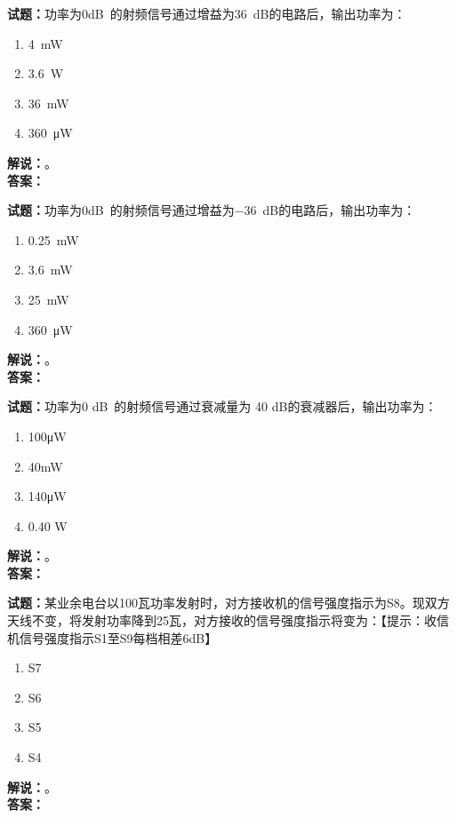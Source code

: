 \documentclass{ctexbook}
\begin{document}
\bigskip




\noindent\textbf{试题：}功率为\num{0}\unit[qualifier-mode=combine]{\deci\bel{}}的射频信号通过增益为\SI{36}{\dB}的电路后，输出功率为：
\begin{enumerate}[leftmargin=3em]
\item \SI{4}{\mW}
\item \SI{3.6}{\W}
\item \SI{36}{\mW}
\item \SI{360}{\uW}
\end{enumerate}
\noindent\textbf{解说：}\textbf{}。\\\noindent\textbf{答案：}

\bigskip




\noindent\textbf{试题：}功率为\num{0}\unit[qualifier-mode=combine]{\deci\bel{}}的射频信号通过增益为\SI{-36}{\dB}的电路后，输出功率为：
\begin{enumerate}[leftmargin=3em]
\item \SI{0.25}{\mW}
\item \SI{3.6}{\mW}
\item \SI{25}{\mW}
\item \SI{360}{\uW}
\end{enumerate}
\noindent\textbf{解说：}\textbf{}。\\\noindent\textbf{答案：}

\bigskip




\noindent\textbf{试题：}功率为0 \unit[qualifier-mode=combine]{\deci\bel{}}的射频信号通过衰减量为 40 dB的衰减器后，输出功率为：
\begin{enumerate}[leftmargin=3em]
\item 100μW
\item 40mW
\item 140μW
\item 0.40 W
\end{enumerate}
\noindent\textbf{解说：}\textbf{}。\\\noindent\textbf{答案：}

\bigskip




\noindent\textbf{试题：}某业余电台以100瓦功率发射时，对方接收机的信号强度指示为S8。现双方天线不变，将发射功率降到25瓦，对方接收的信号强度指示将变为：【提示：收信机信号强度指示S1至S9每档相差6dB】
\begin{enumerate}[leftmargin=3em]
\item S7
\item S6
\item S5
\item S4
\end{enumerate}
\noindent\textbf{解说：}\textbf{}。\\\noindent\textbf{答案：}
\end{document}
